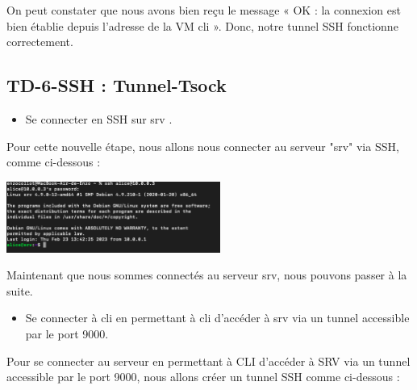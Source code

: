 \documentclass[12pt]{article}
\begin{document}
\vspace{0.3cm}

On peut constater que nous avons bien reçu le message « OK : la connexion est bien établie depuis l’adresse de la VM cli ». Donc, notre tunnel SSH fonctionne correctement.

\newpage

\subsection{TD-6-SSH : Tunnel-Tsock}

\vspace{0.3cm}

\begin{itemize}
  \item Se connecter en SSH sur srv .
\end{itemize}

\vspace{0.3cm}

Pour cette nouvelle étape, nous allons nous connecter au serveur "srv" via SSH, comme ci-dessous :

\vspace{0.3cm}

\begin{center}
  \includegraphics[width=7cm]{Images-Client-SSH/Image-TD-SSH-6/connexion-ssh-srv.png}
\end{center}

\vspace{0.3cm}

Maintenant que nous sommes connectés au serveur srv, nous pouvons passer à la suite.

\vspace{0.3cm}

\begin{itemize}
  \item Se connecter à cli en permettant à cli d’accéder à srv via un tunnel accessible par le port 9000.
\end{itemize}

\vspace{0.3cm}

Pour se connecter au serveur en permettant à CLI d'accéder à SRV via un tunnel accessible par le port 9000, nous allons créer un tunnel SSH comme ci-dessous :
\end{document}
